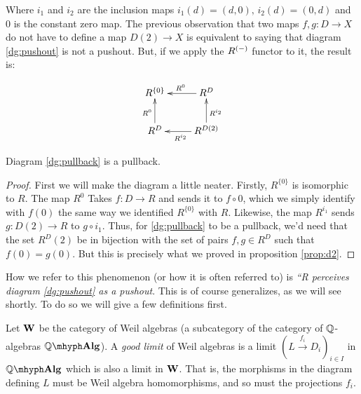 Where \( i_1 \) and \( i_2 \) are the inclusion maps \( i_1(d)=(d,0),\, i_2(d)=(0,d) \) and \( 0 \) is the constant zero map. The previous observation that two maps \( f,g:D\to X \) do not have to define a map \( D(2)\to X \) is equivalent to saying that diagram \ref{dg:pushout} is not a pushout. But, if we apply the \( R^{(-)} \) functor to it, the result is:

\begin{equation*}
  \xymatrix{
    R^{\{0\}}       & R^D \ar[l]_{R^0}                           \\
    R^D \ar[u]^{R^0} & R^{D(2)} \ar[u]_{R^{i_2}} \ar[l]^{R^{i_2}} 
  }
  \label{dg:pullback}
\end{equation*}

\begin{proposition}
  Diagram \ref{dg:pullback} is a pullback.
  \label{prop:pullback}
\end{proposition}

\begin{proof}
  First we will make the diagram a little neater. Firstly, \( R^{\{0\}} \) is isomorphic to \( R \). The map \( R^0 \) Takes \( f:D\to R \) and sends it to \( f\circ 0 \), which we simply identify with \( f(0) \) the same way we identified \( R^{\{0\}} \) with \( R \). Likewise, the map \( R^{i_1} \) sends \( g:D(2)\to R \) to \( g\circ i_1 \). Thus, for \ref{dg:pullback} to be a pullback, we'd need that the set \( R^D(2) \) be in bijection with the set of pairs \( f,g\in R^D \) such that \( f(0)=g(0) \). But this is precisely what we proved in proposition \ref{prop:d2}.
\end{proof}

How we refer to this phenomenon (or how it is often referred to) is \emph{``R perceives diagram \ref{dg:pushout} as a pushout}. This is of course generalizes, as we will see shortly. To do so we will give a few definitions first.

\begin{defn}
  Let \( \mathbf W \) be the category of Weil algebras (a subcategory of the category of \( \mathbb{Q} \)-algebras \( \qalg \)). A \emph{good limit} of Weil algebras is a limit \( \left(L\stackrel{f_i}{\longrightarrow}D_i\right)_{i\in I} \) in \( \qalg \) which is also a limit in \( \mathbf W \). That is, the morphisms in the diagram defining \( L \) must be Weil algebra homomorphisms, and so must the projections \( f_i \).
\end{defn}

